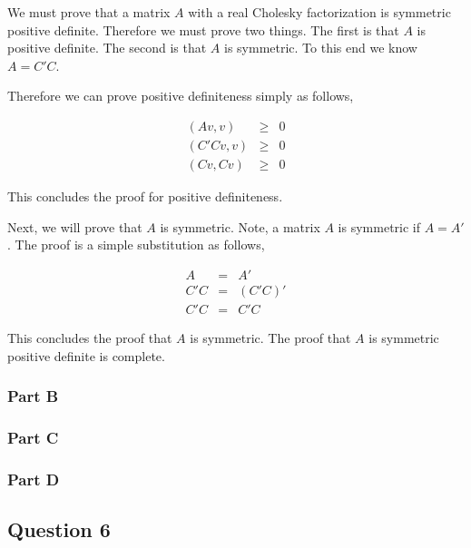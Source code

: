 We must prove that a matrix \(A\) with a real Cholesky factorization is symmetric positive definite.
Therefore we must prove two things.
The first is that \(A\) is positive definite.
The second is that \(A\) is symmetric.
To this end we know \(A = C'C\).

Therefore we can prove positive definiteness simply as follows,

\begin{eqnarray}
  (Av,v) &\ge& 0 \\
  (C'Cv,v) &\ge& 0 \\
  (Cv,Cv) &\ge& 0
\end{eqnarray}

This concludes the proof for positive definiteness.

Next, we will prove that \(A\) is symmetric.
Note, a matrix \(A\) is symmetric if \(A = A'\).
The proof is a simple substitution as follows,

\begin{eqnarray}
  A &=& A' \\
  C'C &=& (C'C)' \\
  C'C &=& C'C
\end{eqnarray}

This concludes the proof that \(A\) is symmetric.
The proof that \(A\) is symmetric positive definite is complete.

\subsubsection{Part B}
\subsubsection{Part C}
\subsubsection{Part D}

\newpage
\subsection{Question 6}

%
